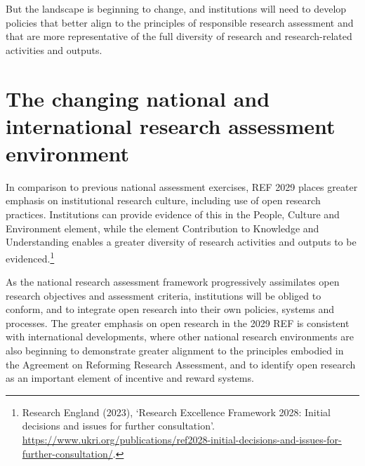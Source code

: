 \documentclass[
  letterpaper,
  DIV=11,
  numbers=noendperiod,
  oneside]{scrreprt}
\begin{document}
But the landscape is beginning to change, and institutions will need to
develop policies that better align to the principles of responsible
research assessment and that are more representative of the full
diversity of research and research-related activities and outputs.

\section{The changing national and international research assessment
environment}\label{the-changing-national-and-international-research-assessment-environment}

In comparison to previous national assessment exercises, REF 2029 places
greater emphasis on institutional research culture, including use of
open research practices. Institutions can provide evidence of this in
the People, Culture and Environment element, while the element
Contribution to Knowledge and Understanding enables a greater diversity
of research activities and outputs to be evidenced.\footnote{Research
  England (2023), `Research Excellence Framework 2028: Initial decisions
  and issues for further consultation'.
  \url{https://www.ukri.org/publications/ref2028-initial-decisions-and-issues-for-further-consultation/}.}

As the national research assessment framework progressively assimilates
open research objectives and assessment criteria, institutions will be
obliged to conform, and to integrate open research into their own
policies, systems and processes. The greater emphasis on open research
in the 2029 REF is consistent with international developments, where
other national research environments are also beginning to demonstrate
greater alignment to the principles embodied in the Agreement on
Reforming Research Assessment, and to identify open research as an
important element of incentive and reward systems.
\end{document}

